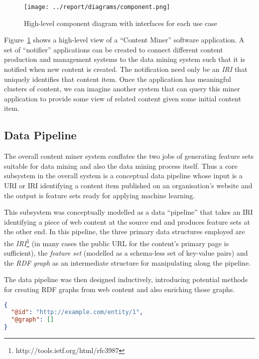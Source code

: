 \documentclass{sig-alternate-05-2015}
\begin{document}
\begin{figure}[h]
  \begin{center}
    \texttt{[image: ../report/diagrams/component.png]}
  \end{center}
  \caption{High-level component diagram with interfaces for each use case\label{fig:component}}
\end{figure}

Figure~\ref{fig:component} shows a high-level view of a ``Content Miner''
software application. A set of ``notifier''
applications can be created to connect different content production and
management systems to the data mining system such that it is notified when new
content is created. The notification need only be an \emph{IRI} that uniquely
identifies that content item. Once the application has meaningful clusters of
content, we can imagine another system that can query this miner application
to provide some view of related content given some initial content item.

\subsection{Data Pipeline}

The overall content miner system conflates the two jobs of generating
feature sets suitable for data mining and also the data mining process itself.
Thus a core subsystem in the overall system is a conceptual data pipeline whose
input is a URI or IRI identifying a content item published on an organisation's
website and the output is feature sets ready for applying machine learning.

This subsystem was conceptually modelled as a data ``pipeline'' that takes
an IRI identifying a piece of web content at the source end and produces
feature sets at the other end. In this pipeline, the three primary data
structures employed are the \emph{IRI}\footnote{http://tools.ietf.org/html/rfc3987}
(in many cases the public URL for the content's primary page is sufficient),
the \emph{feature set} (modelled as a schema-less set of key-value pairs)
and the \emph{RDF graph} as an intermediate structure for manipulating along
the pipeline.

The data pipeline was then designed inductively, introducing potential
methods for creating RDF graphs from web content and also enriching those
graphs.

\begin{centering}
\begin{lstlisting}[label=lst:jsonld-identity,caption={Identity graph for a content item in JSON-LD syntax},language=json]
{
  "@id": "http://example.com/entity/1",
  "@graph": []
}
\end{lstlisting}
\end{centering}
\end{document}
